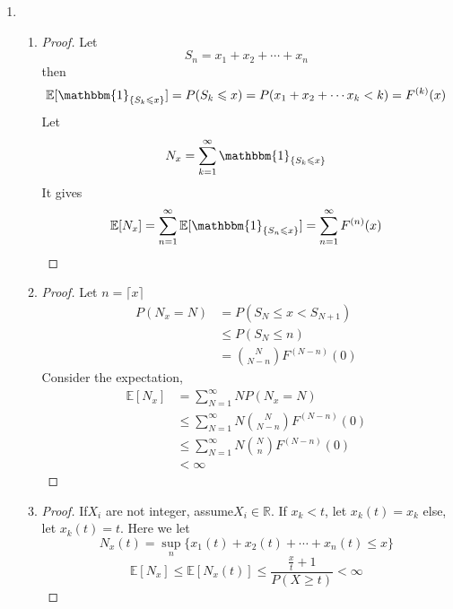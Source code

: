 \documentclass{article}
\begin{document}
\begin{enumerate}
        \item \begin{enumerate}
            \item \begin{proof} 
                Let $$S_n=x_1+x_2+\cdots+x_n$$
                then $$\mathbb{E}[\mathbbm{1}_{\{S_k\leqslant x\}}]
                =P(S_k\leqslant x)
                =P(x_1+x_2+\cdots x_k<k)
                =F^{(k)}(x)$$
                Let $$N_x=\sum_{k=1}^{\infty}\mathbbm{1}_{\{S_k\leqslant x\}}$$
                It gives
                $$\mathbb{E}[N_x]=\sum_{n=1}^{\infty}\mathbb{E}[\mathbbm{1}_{\{S_n\leqslant x\}}]=\sum_{n=1}^{\infty}F^{(n)}(x)$$
            \end{proof}
            \item \begin{proof}
            Let $n=\lceil x \rceil$
               \begin{align*}
                   P(N_x=N)&=P(S_N \leqslant x <S_{N+1})\\
                   &\leqslant P(S_N \leqslant n)\\
                   &=\binom{N}{N-n}F^{(N-n)}(0)
               \end{align*}
               Consider the expectation,
               \begin{align*}
                   \mathbb{E}[N_x]&=\sum_{N=1}^{\infty}NP(N_x=N)\\
                   &\leqslant \sum_{N=1}^\infty N\binom{N}{N-n}F^{(N-n)}(0)\\
                   &\leqslant \sum_{N=1}^{\infty}N\binom{N}{n}F^{(N-n)}(0)\\
                   &<\infty
               \end{align*}
            \end{proof}
            \item \begin{proof}
                If$X_i$ are not integer, assume$X_i \in \mathbb{R}$.
                If $x_k < t$, let $x_k(t)=x_k$ else, let $x_k(t)=t$.
                Here we let $$N_x(t) = \sup_n{\{x_1(t)+x_2(t)+\cdots+x_n(t)\leqslant x\}}$$
                $$\mathbb{E}[N_x]\leqslant\mathbb{E}[N_x(t)]
                \leqslant \frac{\frac{x}{t}+1}{P(X\geqslant t)}<\infty$$
            \end{proof}
            \end{enumerate}



\end{enumerate}
\end{document}
